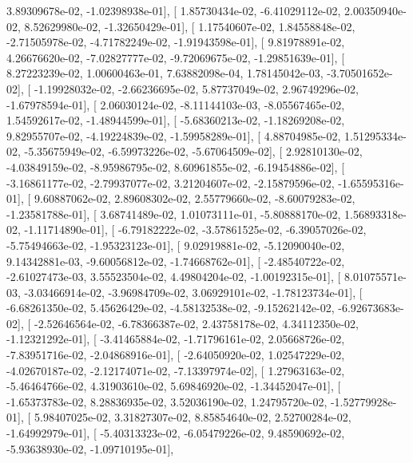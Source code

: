 \documentclass{article}
\begin{document}
          3.89309678e-02,  -1.02398938e-01],
       [  1.85730434e-02,  -6.41029112e-02,   2.00350940e-02,
          8.52629980e-02,  -1.32650429e-01],
       [  1.17540607e-02,   1.84558848e-02,  -2.71505978e-02,
         -4.71782249e-02,  -1.91943598e-01],
       [  9.81978891e-02,   4.26676620e-02,  -7.02827777e-02,
         -9.72069675e-02,  -1.29851639e-01],
       [  8.27223239e-02,   1.00600463e-01,   7.63882098e-04,
          1.78145042e-03,  -3.70501652e-02],
       [ -1.19928032e-02,  -2.66236695e-02,   5.87737049e-02,
          2.96749296e-02,  -1.67978594e-01],
       [  2.06030124e-02,  -8.11144103e-03,  -8.05567465e-02,
          1.54592617e-02,  -1.48944599e-01],
       [ -5.68360213e-02,  -1.18269208e-02,   9.82955707e-02,
         -4.19224839e-02,  -1.59958289e-01],
       [  4.88704985e-02,   1.51295334e-02,  -5.35675949e-02,
         -6.59973226e-02,  -5.67064509e-02],
       [  2.92810130e-02,  -4.03849159e-02,  -8.95986795e-02,
          8.60961855e-02,  -6.19454886e-02],
       [ -3.16861177e-02,  -2.79937077e-02,   3.21204607e-02,
         -2.15879596e-02,  -1.65595316e-01],
       [  9.60887062e-02,   2.89608302e-02,   2.55779660e-02,
         -8.60079283e-02,  -1.23581788e-01],
       [  3.68741489e-02,   1.01073111e-01,  -5.80888170e-02,
          1.56893318e-02,  -1.11714890e-01],
       [ -6.79182222e-02,  -3.57861525e-02,  -6.39057026e-02,
         -5.75494663e-02,  -1.95323123e-01],
       [  9.02919881e-02,  -5.12090040e-02,   9.14342881e-03,
         -9.60056812e-02,  -1.74668762e-01],
       [ -2.48540722e-02,  -2.61027473e-03,   3.55523504e-02,
          4.49804204e-02,  -1.00192315e-01],
       [  8.01075571e-03,  -3.03466914e-02,  -3.96984709e-02,
          3.06929101e-02,  -1.78123734e-01],
       [ -6.68261350e-02,   5.45626429e-02,  -4.58132538e-02,
         -9.15262142e-02,  -6.92673683e-02],
       [ -2.52646564e-02,  -6.78366387e-02,   2.43758178e-02,
          4.34112350e-02,  -1.12321292e-01],
       [ -3.41465884e-02,  -1.71796161e-02,   2.05668726e-02,
         -7.83951716e-02,  -2.04868916e-01],
       [ -2.64050920e-02,   1.02547229e-02,  -4.02670187e-02,
         -2.12174071e-02,  -7.13397974e-02],
       [  1.27963163e-02,  -5.46464766e-02,   4.31903610e-02,
          5.69846920e-02,  -1.34452047e-01],
       [ -1.65373783e-02,   8.28836935e-02,   3.52036190e-02,
          1.24795720e-02,  -1.52779928e-01],
       [  5.98407025e-02,   3.31827307e-02,   8.85854640e-02,
          2.52700284e-02,  -1.64992979e-01],
       [ -5.40313323e-02,  -6.05479226e-02,   9.48590692e-02,
         -5.93638930e-02,  -1.09710195e-01],
\end{document}

